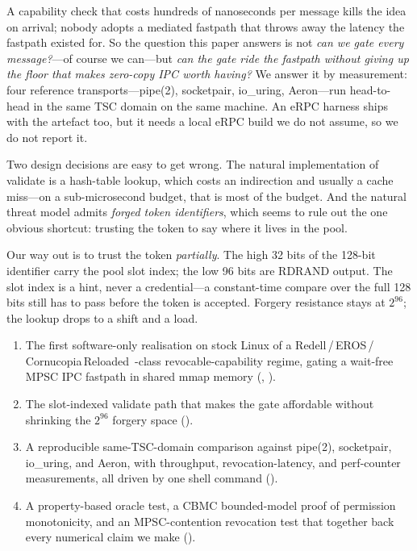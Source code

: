 A capability check that costs hundreds of nanoseconds per message
kills the idea on arrival; nobody adopts a mediated fastpath that
throws away the latency the fastpath existed for. So the question
this paper answers is not \emph{can we gate every message?}---of
course we can---but \emph{can the gate ride the fastpath without
giving up the floor that makes zero-copy IPC worth having?} We answer
it by measurement: four reference transports---pipe(2), socketpair,
io\_uring, Aeron---run head-to-head in the same TSC domain on the same
machine. An eRPC harness ships with the artefact too, but it needs a
local eRPC build we do not assume, so we do not report it.

Two design decisions are easy to get wrong. The natural
implementation of validate is a hash-table lookup, which costs an
indirection and usually a cache miss---on a sub-microsecond budget,
that is most of the budget. And the natural threat model admits
\textit{forged token identifiers}, which seems to rule out the one
obvious shortcut: trusting the token to say where it lives in the
pool.

Our way out is to trust the token \emph{partially}. The high 32 bits
of the 128-bit identifier carry the pool slot index; the low 96 bits
are RDRAND output. The slot index is a hint, never a credential---a
constant-time compare over the full 128 bits still has to pass before
the token is accepted. Forgery resistance stays at $2^{96}$; the
lookup drops to a shift and a load.

\begin{enumerate}
\itemsep0pt
\item The first software-only realisation on stock Linux of a
Redell\,/\,EROS\,/\,Cornucopia\,Reloaded~\cite{redell74,
shapiro1999eros,cornucopia-reloaded}-class revocable-capability
regime, gating a wait-free MPSC IPC fastpath in shared mmap memory
(, ).
\item The slot-indexed validate path that makes the gate affordable
without shrinking the $2^{96}$ forgery space
().
\item A reproducible same-TSC-domain comparison against pipe(2),
socketpair, io\_uring, and Aeron, with throughput,
revocation-latency, and perf-counter measurements, all driven by one
shell command ().
\item A property-based oracle test, a CBMC bounded-model proof of
permission monotonicity, and an MPSC-contention revocation test that
together back every numerical claim we make
().
\end{enumerate}

